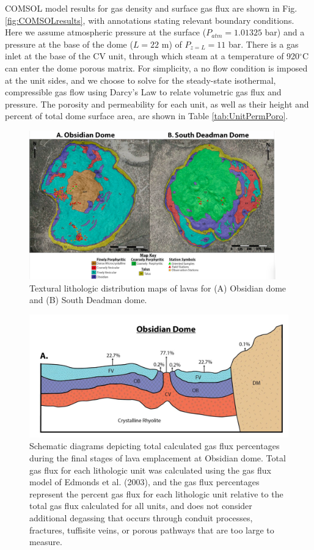 \documentclass[11pt]{amsart}
\begin{document}
COMSOL model results for gas density and surface gas flux are shown in Fig. \ref{fig:COMSOLresults}, with annotations stating relevant boundary conditions. Here we assume atmospheric pressure at the surface ($P_{atm} = 1.01325$ bar) and a pressure at the base of the dome ($L=22$ m) of $P_{z=L} = 11$ bar. There is a gas inlet at the base of the CV unit, through which steam at a temperature of 920$^{\circ}$C can enter the dome porous matrix. For simplicity, a no flow condition is imposed at the unit sides, and we choose to solve for the steady-state isothermal, compressible gas flow using Darcy's Law to relate volumetric gas flux and pressure. The porosity and permeability for each unit, as well as their height and percent of total dome surface area, are shown in Table \ref{tab:UnitPermPoro}.

\begin{figure}
   \centering
\includegraphics[width=0.95\textwidth]{figs/unitMapping-small.png}
\caption{Textural lithologic distribution maps of lavas for (A) Obsidian dome and (B) South Deadman dome.}
\label{fig:unitMapping}
\end{figure}

\begin{figure}
   \centering
\includegraphics[scale=0.5]{figs/crossSection.png}
\caption{Schematic diagrams depicting total calculated gas flux percentages during the final stages of lava emplacement at Obsidian dome. Total gas flux for each lithologic unit was calculated using the gas flux model of Edmonds et al. (2003), and the gas flux percentages represent the percent gas flux for each lithologic unit relative to the total gas flux calculated for all units, and does not consider additional degassing that occurs through conduit processes, fractures, tuffisite veins, or porous pathways that are too large to measure.}
\label{fig:crossSection}
\end{figure}
\end{document}
